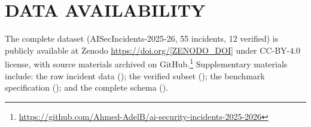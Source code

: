 \documentclass[10pt,conference]{IEEEtran}
\begin{document}
\section*{DATA AVAILABILITY}

The complete dataset (AISecIncidents-2025-26, 55 incidents, 12 verified) is publicly available at Zenodo \url{https://doi.org/[ZENODO_DOI]} under CC-BY-4.0 license, with source materials archived on GitHub.\footnote{\url{https://github.com/Ahmed-AdelB/ai-security-incidents-2025-2026}} Supplementary materials include: the raw incident data (); the verified subset (); the benchmark specification (); and the complete schema ().



\end{document}
